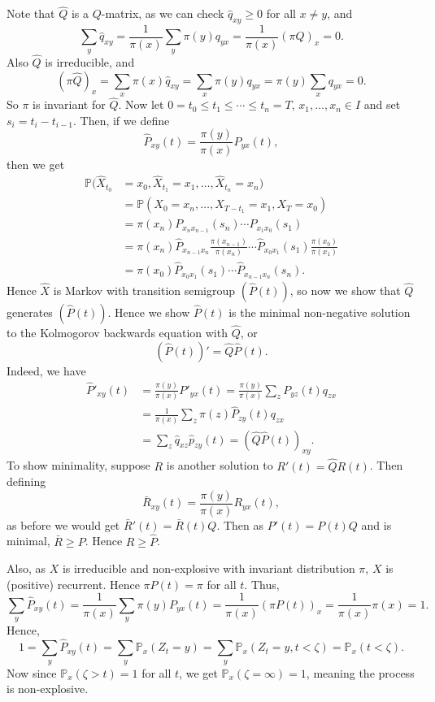 \documentclass[12pt]{article}
\begin{document}
\begin{proofbox}
	Note that $\hat Q$ is a $Q$-matrix, as we can check $\hat q_{xy} \geq 0$ for all $x \neq y$, and
	\[
	\sum_{y} \hat q_{xy} = \frac{1}{\pi(x)} \sum_{y} \pi(y) q_{yx} = \frac{1}{\pi(x)} (\pi Q)_{x} = 0
	.\]
	Also $\hat Q$ is irreducible, and
	\[
		(\pi \hat Q)_{x} = \sum_{x} \pi(x) \hat q_{xy} = \sum_{x} \pi(y) q_{yx} = \pi(y) \sum_{x} q_{yx} = 0
	.\]
	So $\pi$ is invariant for $\hat Q$. Now let $0 = t_0 \leq t_1 \leq \cdots \leq t_n = T$, $x_1, \ldots, x_n \in I$ and set $s_i = t_i - t_{i-1}$. Then, if we define
	\[
	\hat P_{xy}(t) = \frac{\pi(y)}{\pi(x)} P_{yx}(t)
	,\]
	then we get
	\begin{align*}
		\mathbb{P}(\hat X_{t_0} &= x_0, \hat X_{t_1} = x_1, \ldots, \hat X_{t_n} = x_n) \\
					&= \mathbb{P}(X_0 = x_n, \ldots, X_{T-t_1} = x_1, X_{T} = x_0) \\
					&= \pi(x_n) P_{x_n x_{n-1}}(s_n) \cdots P_{x_1x_0}(s_1) \\
					&= \pi(x_n) \hat P_{x_{n-1}x_n} \frac{\pi(x_{n-1})}{\pi(x_n)} \cdots \hat P_{x_0 x_1}(s_1) \frac{\pi(x_0)}{\pi(x_1)} \\
					&= \pi(x_0) \hat P_{x_0x_1}(s_1) \cdots \hat P_{x_{n-1}x_n}(s_n).
	\end{align*}
	Hence $\hat X$ is Markov with transition semigroup $(\hat P(t))$, so now we show that $\hat Q$ generates $(\hat P(t))$. Hence we show $\hat P(t)$ is the minimal non-negative solution to the Kolmogorov backwards equation with $\hat Q$, or
	\[
		(\hat P(t))' = \hat Q \hat P(t)
	.\]
	Indeed, we have
	\begin{align*}
		\hat P'_{xy}(t) &= \frac{\pi(y)}{\pi(x)} P'_{yx}(t) = \frac{\pi(y)}{\pi(x)} \sum_{z} P_{yz}(t) q_{zx} \\
				&= \frac{1}{\pi(x)} \sum_{z} \pi(z) \hat P_{zy}(t) q_{zx} \\
				&= \sum_{z} \hat q_{xz} \hat p_{zy}(t) = (\hat Q \hat P(t))_{xy}.
	\end{align*}
	To show minimality, suppose $R$ is another solution to $R'(t) = \hat Q R(t)$. Then defining
	\[
	\bar R_{xy}(t) = \frac{\pi(y)}{\pi(x)} R_{yx}(t)
	,\]
	as before we would get $\bar R'(t) = \bar R(t) Q$. Then as $P'(t) = P(t) Q$ and is minimal, $\bar R \geq P$. Hence $R \geq \hat P$.

	Also, as $X$ is irreducible and non-explosive with invariant distribution $\pi$, $X$ is (positive) recurrent. Hence $\pi P(t) = \pi$ for all $t$. Thus,
	\[
	\sum_{y} \hat P_{xy}(t) = \frac{1}{\pi(x)} \sum_{y} \pi(y) P_{yx}(t) = \frac{1}{\pi(x)}(\pi P(t))_{x} = \frac{1}{\pi(x)}\pi(x) = 1
	.\]
	Hence,
	\[
		1 = \sum_{y} \hat P_{xy}(t) = \sum_{y} \mathbb{P}_x(Z_t = y) = \sum_{y} \mathbb{P}_x(Z_t = y, t < \zeta) = \mathbb{P}_x(t < \zeta)
	.\]
	Now since $\mathbb{P}_x(\zeta > t) = 1$ for all $t$, we get $\mathbb{P}_x(\zeta = \infty) = 1$, meaning the process is non-explosive.
\end{proofbox}
\end{document}
